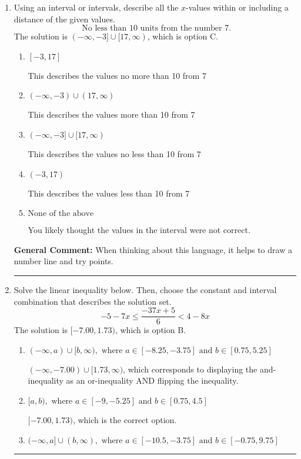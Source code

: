 \documentclass{extbook}[14pt]
\newcommand{\litem}[1]{\item #1

\rule{\textwidth}{0.4pt}}
\begin{document}
\begin{enumerate}
{\begin{enumerate}[label=\Alph*.]
Corresponds to including the endpoints AND negating.
\item \( (-\infty, \infty) \)

Corresponds to the variable canceling, which does not happen in this instance.
\end{enumerate}

\textbf{General Comment:} When multiplying or dividing by a negative, flip the sign.
}
\litem{
Using an interval or intervals, describe all the $x$-values within or including a distance of the given values.
\[ \text{ No less than } 10 \text{ units from the number } 7. \]The solution is \( (-\infty, -3] \cup [17, \infty) \), which is option C.\begin{enumerate}[label=\Alph*.]
\item \( [-3, 17] \)

This describes the values no more than 10 from 7
\item \( (-\infty, -3) \cup (17, \infty) \)

This describes the values more than 10 from 7
\item \( (-\infty, -3] \cup [17, \infty) \)

This describes the values no less than 10 from 7
\item \( (-3, 17) \)

This describes the values less than 10 from 7
\item \( \text{None of the above} \)

You likely thought the values in the interval were not correct.
\end{enumerate}

\textbf{General Comment:} When thinking about this language, it helps to draw a number line and try points.
}
\litem{
Solve the linear inequality below. Then, choose the constant and interval combination that describes the solution set.
\[ -5 - 7 x \leq \frac{-37 x + 5}{6} < 4 - 8 x \]The solution is \( [-7.00, 1.73) \), which is option B.\begin{enumerate}[label=\Alph*.]
\item \( (-\infty, a) \cup [b, \infty), \text{ where } a \in [-8.25, -3.75] \text{ and } b \in [0.75, 5.25] \)

$(-\infty, -7.00) \cup [1.73, \infty)$, which corresponds to displaying the and-inequality as an or-inequality AND flipping the inequality.
\item \( [a, b), \text{ where } a \in [-9, -5.25] \text{ and } b \in [0.75, 4.5] \)

$[-7.00, 1.73)$, which is the correct option.
\item \( (-\infty, a] \cup (b, \infty), \text{ where } a \in [-10.5, -3.75] \text{ and } b \in [-0.75, 9.75] \)


\end{enumerate}}
\end{enumerate}
\end{document}
